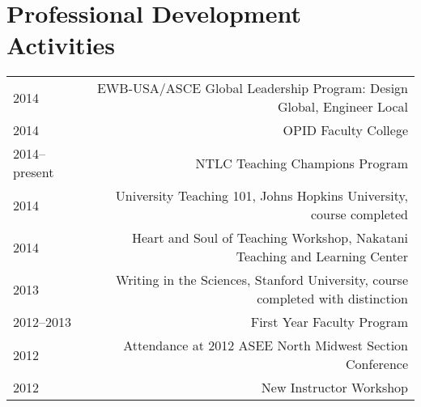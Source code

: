 \section*{Professional Development Activities}
\begin{tabular}{L!{\VRule}R}
2014&EWB-USA/ASCE Global Leadership Program: Design Global, Engineer Local\\
2014&OPID Faculty College\\
2014--present&NTLC Teaching Champions Program\\
2014&University Teaching 101, Johns Hopkins University, course completed\\
2014&Heart and Soul of Teaching Workshop, Nakatani Teaching and Learning Center\\
2013&Writing in the Sciences, Stanford University, course completed with distinction\\
2012--2013&First Year Faculty Program\\
2012&Attendance at 2012 ASEE North Midwest Section Conference\\
2012&New Instructor Workshop\\
\end{tabular}